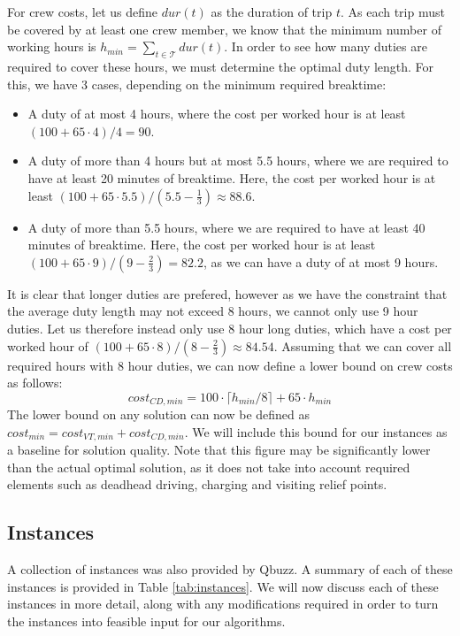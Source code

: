 \documentclass[]{article}
\begin{document}
For crew costs, let us define $dur(t)$ as the duration of trip $t$. As each trip must be covered by at least one crew member, we know that the minimum number of working hours is $h_{min} = $$\sum_{t \in \mathcal{T}} dur(t)$. In order to see how many duties are required to cover these hours, we must determine the optimal duty length. For this, we have 3 cases, depending on the minimum required breaktime: 
\begin{itemize}
  \item A duty of at most 4 hours, where the cost per worked hour is at least $(100 + 65 \cdot 4) / 4 = 90$.
  \item A duty of more than 4 hours but at most 5.5 hours, where we are required to have at least 20 minutes of breaktime. Here, the cost per worked hour is at least $(100 + 65 \cdot 5.5) / (5.5 - \frac{1}{3}) \approx 88.6$.
  \item A duty of more than 5.5 hours, where we are required to have at least 40 minutes of breaktime. Here, the cost per worked hour is at least $(100 + 65 \cdot 9) / (9 - \frac{2}{3}) = 82.2$, as we can have a duty of at most 9 hours.
\end{itemize}
It is clear that longer duties are prefered, however as we have the constraint that the average duty length may not exceed 8 hours, we cannot only use 9 hour duties. Let us therefore instead only use 8 hour long duties, which have a cost per worked hour of $(100 + 65 \cdot 8) / (8 - \frac{2}{3}) \approx 84.54$. Assuming that we can cover all required hours with 8 hour duties, we can now define a lower bound on crew costs as follows:
\begin{equation}
  cost_{CD,min} = 100 \cdot \lceil h_{min} / 8 \rceil + 65 \cdot h_{min} \nonumber
\end{equation}
The lower bound on any solution can now be defined as $cost_{min} = cost_{VT,min} + cost_{CD,min}$. We will include this bound for our instances as a baseline for solution quality. Note that this figure may be significantly lower than the actual optimal solution, as it does not take into account required elements such as deadhead driving, charging and visiting relief points.

\subsection{Instances}
A collection of instances was also provided by Qbuzz. A summary of each of these instances is provided in Table \ref{tab:instances}. We will now discuss each of these instances in more detail, along with any modifications required in order to turn the instances into feasible input for our algorithms. 
\end{document}
